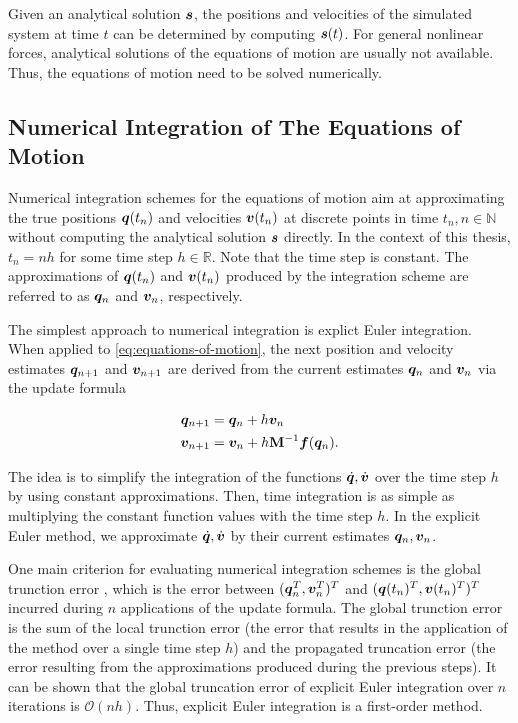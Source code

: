\noindent Given an analytical solution $\bm{s}$, the positions and velocities of the simulated system at time $t$ can be determined by computing 
$\bm{s}(t)$. For general nonlinear forces, analytical solutions of the equations of motion are usually not available. Thus, the equations of motion 
need to be solved numerically.

\subsection{Numerical Integration of The Equations of Motion}\label{ss:numerical-integration}
Numerical integration schemes for the equations of motion aim at approximating the true positions $\bm{q}(t_n)$ and velocities $\bm{v}(t_n)$ 
at discrete points in time $t_n, n \in \mathbb{N}$ without computing the analytical solution $\bm{s}$ directly. In the context of this 
thesis, $t_n = nh$ for some time step $h \in \mathbb{R}$. Note that the time step is constant. The approximations of $\bm{q}(t_n)$ 
and $\bm{v}(t_n)$ produced by the integration scheme are referred to as $\bm{q}_n$ and $\bm{v}_n$, respectively. 

The simplest approach to numerical integration is explict Euler integration. 
When applied to \autoref{eq:equations-of-motion}, the next position and velocity estimates $\bm{q}_{n+1}$ and $\bm{v}_{n+1}$ are derived 
from the current estimates $\bm{q}_n$ and $\bm{v}_n$ via the update formula

\begin{align*}
    \bm{q}_{n+1} &= \bm{q}_n + h\bm{v}_n\\
    \bm{v}_{n+1} &= \bm{v}_n + h\mathbf{M}^{-1}\bm{f}(\bm{q}_n).
\end{align*}

\noindent The idea is to simplify the integration of the functions $\dot{\bm{q}}, \dot{\bm{v}}$ over the time step $h$ by using constant 
approximations. Then, time integration is as simple as multiplying the constant function values 
with the time step $h$. In the explicit Euler method, we approximate $\dot{\bm{q}}, \dot{\bm{v}}$ by their current estimates $\bm{q}_n , 
\bm{v}_n$.

One main criterion for evaluating numerical integration schemes is the global trunction error \cite{chapra2005}, which is the error between 
$(\bm{q}^T_n, \bm{v}^T_n)^T$ and $(\bm{q}(t_n)^T, \bm{v}(t_n)^T)^T$ incurred during $n$ applications of the update formula. The global 
trunction error is the sum 
of the local trunction error (the error that results in the application of the method over a single time step $h$) and the propagated truncation 
error (the
error resulting from the approximations produced during the previous steps). It can be shown that the global truncation error of explicit Euler 
integration over $n$ iterations is $\mathcal{O}(nh)$. Thus, explicit Euler integration is a first-order method. 

